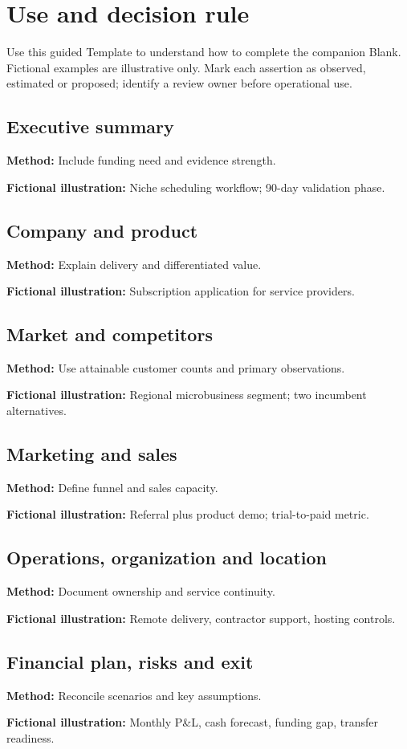 \documentclass[11pt]{article}
\begin{document}
\SuiteOpen
\section{Use and decision rule}
Use this guided Template to understand how to complete the companion Blank. Fictional examples are illustrative only. Mark each assertion as observed, estimated or proposed; identify a review owner before operational use.
\subsection*{Executive summary}
\textbf{Method:} Include funding need and evidence strength.\par\textbf{Fictional illustration:} Niche scheduling workflow; 90-day validation phase.\par
\subsection*{Company and product}
\textbf{Method:} Explain delivery and differentiated value.\par\textbf{Fictional illustration:} Subscription application for service providers.\par
\subsection*{Market and competitors}
\textbf{Method:} Use attainable customer counts and primary observations.\par\textbf{Fictional illustration:} Regional microbusiness segment; two incumbent alternatives.\par
\subsection*{Marketing and sales}
\textbf{Method:} Define funnel and sales capacity.\par\textbf{Fictional illustration:} Referral plus product demo; trial-to-paid metric.\par
\subsection*{Operations, organization and location}
\textbf{Method:} Document ownership and service continuity.\par\textbf{Fictional illustration:} Remote delivery, contractor support, hosting controls.\par
\subsection*{Financial plan, risks and exit}
\textbf{Method:} Reconcile scenarios and key assumptions.\par\textbf{Fictional illustration:} Monthly P\&L, cash forecast, funding gap, transfer readiness.\par
\end{document}
